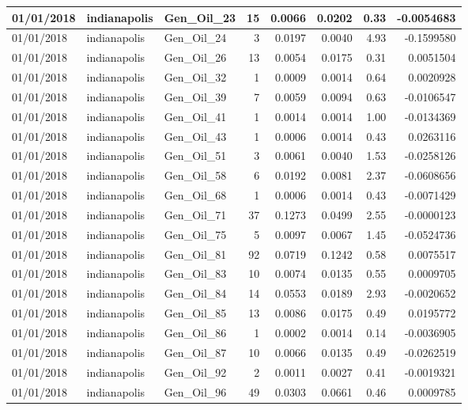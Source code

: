 \documentclass[
  letterpaper,
  DIV=11,
  numbers=noendperiod]{scrartcl}
\begin{document}
\begin{tabular}{l|l|l|r|r|r|r|r}
\hline
01/01/2018 & indianapolis & Gen\_Oil\_23 & 15 & 0.0066 & 0.0202 & 0.33 & -0.0054683\\
\hline
01/01/2018 & indianapolis & Gen\_Oil\_24 & 3 & 0.0197 & 0.0040 & 4.93 & -0.1599580\\
\hline
01/01/2018 & indianapolis & Gen\_Oil\_26 & 13 & 0.0054 & 0.0175 & 0.31 & 0.0051504\\
\hline
01/01/2018 & indianapolis & Gen\_Oil\_32 & 1 & 0.0009 & 0.0014 & 0.64 & 0.0020928\\
\hline
01/01/2018 & indianapolis & Gen\_Oil\_39 & 7 & 0.0059 & 0.0094 & 0.63 & -0.0106547\\
\hline
01/01/2018 & indianapolis & Gen\_Oil\_41 & 1 & 0.0014 & 0.0014 & 1.00 & -0.0134369\\
\hline
01/01/2018 & indianapolis & Gen\_Oil\_43 & 1 & 0.0006 & 0.0014 & 0.43 & 0.0263116\\
\hline
01/01/2018 & indianapolis & Gen\_Oil\_51 & 3 & 0.0061 & 0.0040 & 1.53 & -0.0258126\\
\hline
01/01/2018 & indianapolis & Gen\_Oil\_58 & 6 & 0.0192 & 0.0081 & 2.37 & -0.0608656\\
\hline
01/01/2018 & indianapolis & Gen\_Oil\_68 & 1 & 0.0006 & 0.0014 & 0.43 & -0.0071429\\
\hline
01/01/2018 & indianapolis & Gen\_Oil\_71 & 37 & 0.1273 & 0.0499 & 2.55 & -0.0000123\\
\hline
01/01/2018 & indianapolis & Gen\_Oil\_75 & 5 & 0.0097 & 0.0067 & 1.45 & -0.0524736\\
\hline
01/01/2018 & indianapolis & Gen\_Oil\_81 & 92 & 0.0719 & 0.1242 & 0.58 & 0.0075517\\
\hline
01/01/2018 & indianapolis & Gen\_Oil\_83 & 10 & 0.0074 & 0.0135 & 0.55 & 0.0009705\\
\hline
01/01/2018 & indianapolis & Gen\_Oil\_84 & 14 & 0.0553 & 0.0189 & 2.93 & -0.0020652\\
\hline
01/01/2018 & indianapolis & Gen\_Oil\_85 & 13 & 0.0086 & 0.0175 & 0.49 & 0.0195772\\
\hline
01/01/2018 & indianapolis & Gen\_Oil\_86 & 1 & 0.0002 & 0.0014 & 0.14 & -0.0036905\\
\hline
01/01/2018 & indianapolis & Gen\_Oil\_87 & 10 & 0.0066 & 0.0135 & 0.49 & -0.0262519\\
\hline
01/01/2018 & indianapolis & Gen\_Oil\_92 & 2 & 0.0011 & 0.0027 & 0.41 & -0.0019321\\
\hline
01/01/2018 & indianapolis & Gen\_Oil\_96 & 49 & 0.0303 & 0.0661 & 0.46 & 0.0009785\\

\end{tabular}
\end{document}
